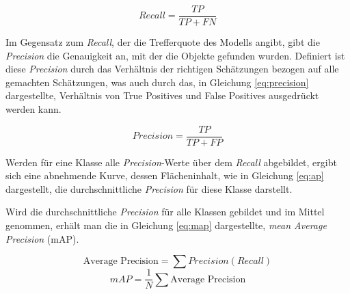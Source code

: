 \begin{equation}
  \label{eq:recall}
  Recall = \frac{TP}{TP + FN}
\end{equation}
\vspace{0.5cm}

Im Gegensatz zum \textit{Recall}, der die Trefferquote
des Modells angibt, gibt die \textit{Precision} die Genauigkeit
an, mit der die Objekte gefunden wurden.
Definiert ist diese \textit{Precision} durch das 
Verhältnis der richtigen Schätzungen bezogen
auf alle gemachten Schätzungen,
was auch durch das, in Gleichung \ref{eq:precision}
dargestellte, Verhältnis von True Positives und False Positives 
ausgedrückt werden kann.
\vspace{0.5cm}

\begin{equation}
  \label{eq:precision}
  Precision = \frac{TP}{TP + FP}
\end{equation}
\vspace{0.5cm}

Werden für eine Klasse alle \textit{Precision}-Werte
über dem \textit{Recall} abgebildet, 
ergibt sich eine abnehmende Kurve, 
dessen Flächeninhalt, wie in Gleichung 
\ref{eq:ap} dargestellt, die durchschnittliche 
\textit{Precision} für diese Klasse darstellt.

Wird die durchschnittliche 
\textit{Precision} für alle Klassen gebildet und 
im Mittel genommen, erhält man die in 
Gleichung \ref{eq:map} dargestellte,
\textit{mean Average Precision} (mAP).

\vspace{0.5cm}
\begin{equation}
  \label{eq:ap}
  \text{Average Precision} = \sum Precision(Recall)
\end{equation}
\vspace{0.5cm}
\begin{equation}
  \label{eq:map}
  mAP = \frac{1}{N} \sum \text{Average Precision}
\end{equation}
\vspace{0.5cm}





